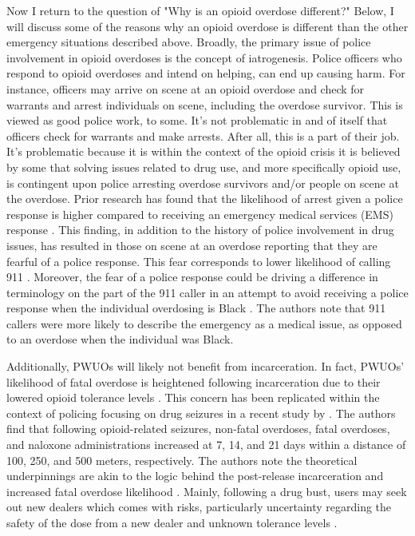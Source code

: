 Now I return to the question of "Why is an opioid overdose different?" Below, I will discuss some of the reasons why an opioid overdose is different than the other emergency situations described above. Broadly, the primary issue of police involvement in opioid overdoses is the concept of iatrogenesis. Police officers who respond to opioid overdoses and intend on helping, can end up causing harm. For instance, officers may arrive on scene at an opioid overdose and check for warrants and arrest individuals on scene, including the overdose survivor. This is viewed as good police work, to some. It's not problematic in and of itself that officers check for warrants and make arrests. After all, this is a part of their job. It's problematic because it is within the context of the opioid crisis it is believed by some that solving issues related to drug use, and more specifically opioid use, is contingent upon police arresting overdose survivors and/or people on scene at the overdose. Prior research has found that the likelihood of arrest given a police response is higher compared to receiving an emergency medical services (EMS) response \parencite{lowder_twoyear_2020}. This finding, in addition to the history of police involvement in drug issues, has resulted in those on scene at an overdose reporting that they are fearful of a police response. This fear corresponds to lower likelihood of calling 911 \parencite{bohnert_policing_2011, van_der_meulen_thats_2021}. Moreover, the fear of a police response could be driving a difference in terminology on the part of the 911 caller in an attempt to avoid receiving a police response when the individual overdosing is Black \parencite{atkins_disparities_2024}. The authors note that 911 callers were more likely to describe the emergency as a medical issue, as opposed to an overdose when the individual was Black. 

Additionally, PWUOs will likely not benefit from incarceration. In fact, PWUOs’ likelihood of fatal overdose is heightened following incarceration due to their lowered opioid tolerance levels \parencite{binswanger_clinical_2016, merrall_meta-analysis_2010}. This concern has been replicated within the context of policing focusing on drug seizures in a recent study by \textcite{ray_spatiotemporal_2023}. The authors find that following opioid-related seizures, non-fatal overdoses, fatal overdoses, and naloxone administrations increased at 7, 14, and 21 days within a distance of 100, 250, and 500 meters, respectively. The authors note the theoretical underpinnings are akin to the logic behind the post-release incarceration and increased fatal overdose likelihood \parencite{seaman_mortality_1998}. Mainly, following a drug bust, users may seek out new dealers which comes with risks, particularly uncertainty regarding the safety of the dose from a new dealer and unknown tolerance levels \parencite{ray_spatiotemporal_2023}.

